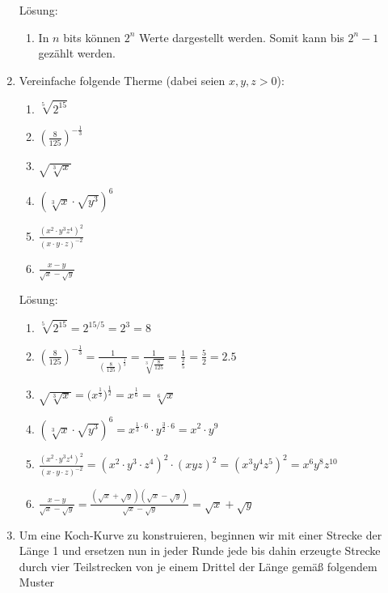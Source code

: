 \documentclass[../main.tex]{subfiles}
\begin{document}
\begin{enumerate}
	      Lösung:
	      \begin{enumerate}
		      \item In \( n  \) bits können \( 2^n \) Werte dargestellt werden.
		            Somit kann bis \( 2^n - 1 \) gezählt werden.
	      \end{enumerate}
	\item
	      Vereinfache folgende Therme (dabei seien \( x, y, z > 0 \)):
	      \begin{enumerate}
		      \item \( \sqrt[5]{2^{15}} \)
		      \item \( (\frac{8}{125})^{-\frac{1}{3}} \)
		      \item \( \sqrt{\sqrt[3]{x}} \)
		      \item \( (\sqrt[3]{x} \cdot \sqrt{y^3})^6 \)
		      \item \( \frac{(x^2 \cdot y^3 z^4)^2}{
			            (x \cdot y \cdot z)^{-2}
		            } \)
		      \item \( \frac{x - y}{ \sqrt{x} - \sqrt{y} } \)
	      \end{enumerate}

	      Lösung:
	      \begin{enumerate}
		      \item \( \sqrt[5]{2^{15}}
			            = 2^{15/5} = 2^3 = 8
		            \)
		      \item \( (\frac{8}{125})^{-\frac{1}{3}}
		            = \frac{1}{ (\frac{8}{125})^{ \frac{1}{3} }}
		            = \frac{1}{ \sqrt[3]{ \frac{8}{125} }}
		            = \frac{1}{ \frac{2}{5}}
		            = \frac{5}{2}
		            = 2.5
		            \)
		      \item \( \sqrt{\sqrt[3]{x}}
		            = \Big( x^{ \frac{1}{3} } \Big)^{ \frac{1}{2} }
		            = x^{ \frac{1}{6}}
		            = \sqrt[6]{x}
		            \)
		      \item \( (\sqrt[3]{x} \cdot \sqrt{y^3})^6
		            = x^{ \frac{1}{3} \cdot 6} \cdot y^{ \frac{3}{2} \cdot 6 }
		            = x^2 \cdot y^9
		            \)
		      \item \( \frac{(x^2 \cdot y^3 z^4)^2}{
			            (x \cdot y \cdot z)^{-2}
		            }
		            = (x^2 \cdot y^3 \cdot z^4)^2 \cdot (xyz)^2
		            = (x^3y^4z^5)^2
		            = x^6y^8z^{10}
		            \)
		      \item \( \frac{x - y}{ \sqrt{x} - \sqrt{y} }
		            = \frac{ (\sqrt{x} + \sqrt{y})(\sqrt{x} - \sqrt{y}) }{
			            \sqrt{x} - \sqrt{y}}
		            = \sqrt{x} + \sqrt{y} \)
	      \end{enumerate}
	\item Um eine Koch-Kurve zu konstruieren, beginnen wir mit einer Strecke der Länge 1 und
	      ersetzen nun in jeder Runde jede bis dahin erzeugte Strecke durch vier Teilstrecken von je einem Drittel
	      der Länge gemäß folgendem Muster


\end{enumerate}
\end{document}
